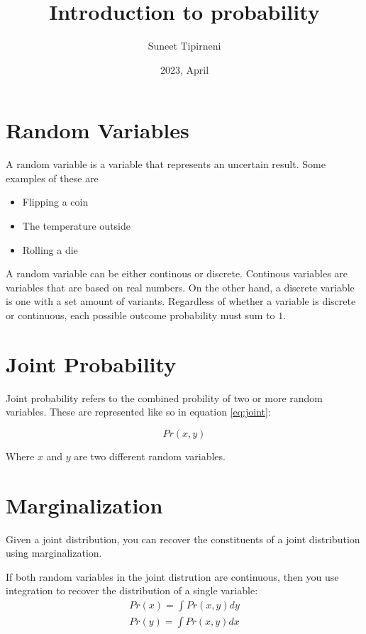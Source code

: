 \documentclass{article}
\title{Introduction to probability}
\date{2023, April}
\author{Suneet Tipirneni}
\begin{document}
\maketitle

\section{Random Variables}

A random variable is a variable that represents an uncertain result. Some examples of these are \par

\begin{itemize}
	\item Flipping a coin
	\item The temperature outside
	\item Rolling a die
\end{itemize}

A random variable can be either continous or discrete. Continous variables are variables that are based on real numbers. On the other hand, a discrete variable is one with a set amount of variants. Regardless of whether a variable is discrete or continuous, each possible outcome probability must sum to $1$.

\section{Joint Probability}

Joint probability refers to the combined probility of two or more random variables. These are represented like so in equation \ref{eq:joint}:

\begin{equation} \label{eq:joint}
	Pr\left( x,y \right) 
\end{equation}

Where $x$ and $y$ are two different random variables.

\section{Marginalization}

Given a joint distribution, you can recover the constituents of a joint distribution using marginalization. 

If both random variables in the joint distrution are continuous, then you use integration to recover the distribution of a single variable:
\begin{align}\label{eq:marginalize-disc}
	Pr\left( x \right)=\int Pr\left( x,y \right)dy \\
	Pr\left( y \right) = \int Pr\left( x,y \right)dx
\end{align}
\end{document}
